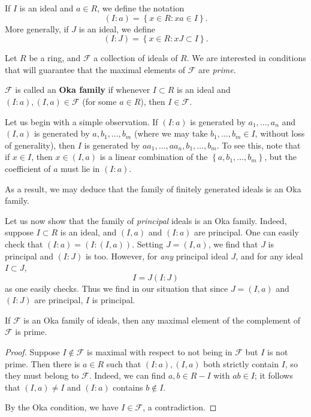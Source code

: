 If $I$ is an ideal and $a \in R$, we define the notation
\[ (I:a) = \left\{ x\in R: xa \in I\right\} . \]
More generally, if $J$ is an ideal, we define
\[ (I:J) = \left\{x \in R: xJ \subset I\right\} . \]

Let $R$ be a ring, and $\mathcal{F}$ a collection of ideals of $R$. 
We are interested in conditions that will guarantee that the maximal elements
of $\mathcal{F}$ are \emph{prime}.
\begin{definition}
$\mathcal{F}$ is called an \textbf{Oka family} if whenever $I \subset R$ is an
ideal and $(I:a), (I,a) \in \mathcal{F}$ (for some $a \in R$), then $I \in
\mathcal{F}$.
\end{definition} 

\begin{example} 
Let us begin with a simple observation. If $(I:a)$ is generated by
$a_1, \dots, a_n$ and $(I,a)$ is generated by $a, b_1, \dots, b_m$ (where we
may take
$b_1, \dots, b_m \in I$, without loss of generality), then $I$
is generated by $aa_1, \dots, aa_n, b_1, \dots, b_m$.
To see this, note that if $x \in I$, then $x \in (I,a)$ is a linear combination 
of the $\left\{a, b_1, \dots, b_m\right\}$, but the coefficient of $a$ must
lie in $(I:a)$.

As a result, we may deduce that
the family of finitely generated ideals is an Oka family.
\end{example} 

\begin{example} 
Let us now show that the family of \emph{principal} ideals is an Oka family.
Indeed, suppose $I \subset R$ is an ideal, and $(I,a)$ and $(I:a)$ are
principal.
One can easily check that
$(I:a) = (I: (I, a))$.
Setting $J = (I,a)$, we find that $J$ is principal and $(I:J)$ is too.
However, for \emph{any} principal ideal $J$, and for any ideal $I \subset J$,
\[ I = J (I: J)  \]
as one easily checks. Thus we find in our situation that since $J=(I,a)$ and $(I:J)$
are principal, $I$ is principal.
\end{example} 

\begin{proposition}\label{okathm} If $\mathcal{F}$ is an Oka family of
ideals, then any maximal element of the complement of $\mathcal{F}$ is prime.
\end{proposition} 
\begin{proof} 
Suppose $I \notin \mathcal{F}$ is maximal with respect 
to not being in $\mathcal{F}$
but $I$ is  not prime.
Then there is $a \in R$ such that $(I:a), (I,a)$ both strictly contain $I$,
so they must belong to $\mathcal{F}$.
Indeed, we can find $a,b \in R - I$ with $ab \in I$; it follows that $(I,a)
\neq I$ and $(I:a)$ contains $b \notin I$.

By the Oka condition, we have $I \in
\mathcal{F}$, a contradiction.
\end{proof} 

